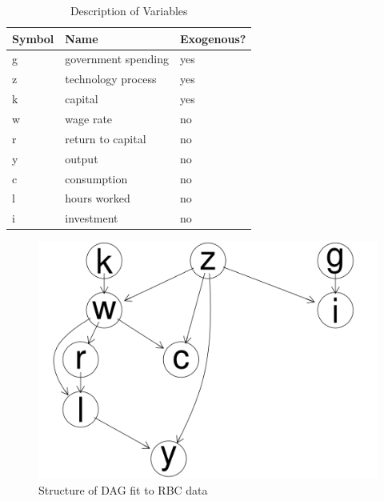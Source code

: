 \documentclass{article}
\begin{document}
\begin{table}
  \centering
  \begin{tabular}{|l|l|l|}
    \hline
    Symbol & Name & Exogenous? \\
    \hline
    g & government spending & yes \\
    z & technology process & yes \\
    k & capital & yes \\
    w & wage rate & no \\
    r & return to capital & no \\
    y & output & no \\
    c & consumption & no \\
    l & hours worked & no \\
    i & investment & no \\ \cline{2-2}
    \hline
  \end{tabular}
  \caption{Description of Variables}
  \label{tab1}
\end{table}

\begin{figure}
  \centering
  \includegraphics[width=\textwidth, height=0.25\textheight, keepaspectratio]{images/rbc_dag.png}
  \caption{Structure of DAG fit to RBC data}
  \label{rbcdag}
\end{figure}
\end{document}
